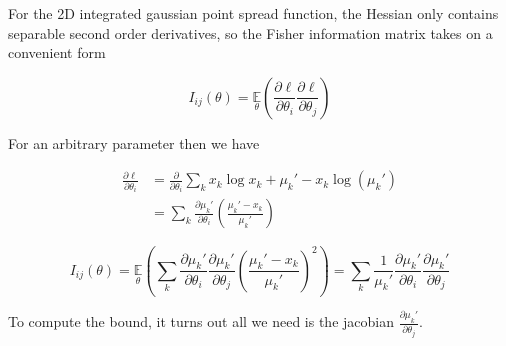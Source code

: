 For the 2D integrated gaussian point spread function, the Hessian only contains separable second order derivatives, so the Fisher information matrix takes on a convenient form

\begin{equation}
I_{ij}(\theta) = \underset{\theta}{\mathbb{E}}\left(\frac{\partial \ell}{\partial\theta_{i}}\frac{\partial\ell}{\partial\theta_{j}}\right) 
\end{equation}

For an arbitrary parameter then we have

\begin{align*}
\frac{\partial \ell}{\partial \theta_{i}} &= \frac{\partial}{\partial \theta_{i}} \sum_{k}  x_{k}\log x_{k} + \mu_{k}' - x_{k}\log\left(\mu_{k}'\right)\\
&= \sum_{k} \frac{\partial \mu_{k}'}{\partial\theta_{i}} \left(\frac{\mu_{k}'-x_{k}}{\mu_{k}'}\right)
\end{align*}

\begin{equation*}
I_{ij}(\theta) = \underset{\theta}{\mathbb{E}}\left(\sum_{k}\frac{\partial \mu_{k}'}{\partial\theta_{i}}\frac{\partial \mu_{k}'}{\partial\theta_{j}} \left(\frac{\mu_{k}'-x_{k}}{\mu_{k}'}\right)^{2}\right) = \sum_{k}\frac{1}{\mu_{k}'}\frac{\partial \mu_{k}'}{\partial\theta_{i}}\frac{\partial \mu_{k}'}{\partial\theta_{j}}
\end{equation*}

To compute the bound, it turns out all we need is the jacobian $\frac{\partial \mu_{k}'}{\partial\theta_{j}} $.


